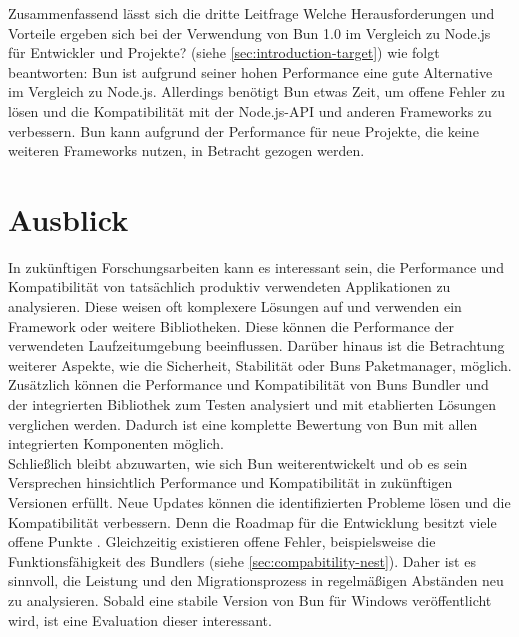 \noindent
Zusammenfassend lässt sich die dritte Leitfrage \glqq Welche Herausforderungen und Vorteile ergeben sich bei der Verwendung von Bun 1.0 im Vergleich zu Node.js für Entwickler und Projekte?\grqq{} (siehe \autoref{sec:introduction-target}) wie folgt beantworten: Bun ist aufgrund seiner hohen Performance eine gute Alternative im Vergleich zu Node.js. Allerdings benötigt Bun etwas Zeit, um offene Fehler zu lösen und die Kompatibilität mit der Node.js-API und anderen Frameworks zu verbessern. Bun kann aufgrund der Performance für neue Projekte, die keine weiteren Frameworks nutzen, in Betracht gezogen werden.


\section{Ausblick} \label{sec:finalThoughts-outlook}
In zukünftigen Forschungsarbeiten kann es interessant sein, die Performance und Kompatibilität von tatsächlich produktiv verwendeten Applikationen zu analysieren. Diese weisen oft komplexere Lösungen auf und verwenden ein Framework oder weitere Bibliotheken. Diese können die Performance der verwendeten Laufzeitumgebung beeinflussen. Darüber hinaus ist die Betrachtung weiterer Aspekte, wie die Sicherheit, Stabilität oder Buns Paketmanager, möglich. Zusätzlich können die Performance und Kompatibilität von Buns Bundler und der integrierten Bibliothek zum Testen analysiert und mit etablierten Lösungen verglichen werden. Dadurch ist eine komplette Bewertung von Bun mit allen integrierten Komponenten möglich.\\

\noindent
Schließlich bleibt abzuwarten, wie sich Bun weiterentwickelt und ob es sein Versprechen hinsichtlich Performance und Kompatibilität in zukünftigen Versionen erfüllt. Neue Updates können die identifizierten Probleme lösen und die Kompatibilität verbessern. Denn die Roadmap für die Entwicklung besitzt viele offene Punkte \cite{Sumner.2022}. Gleichzeitig existieren offene Fehler, beispielsweise die Funktionsfähigkeit des Bundlers (siehe \autoref{sec:compabitility-nest}). Daher ist es sinnvoll, die Leistung und den Migrationsprozess in regelmäßigen Abständen neu zu analysieren. Sobald eine stabile Version von Bun für Windows veröffentlicht wird, ist eine Evaluation dieser interessant.
